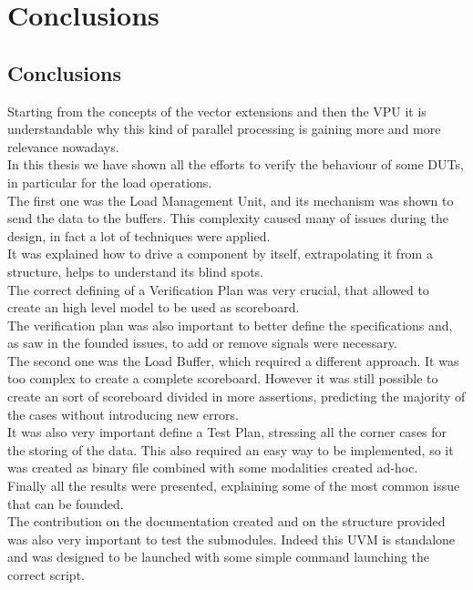 \chapter{Conclusions}
\section{Conclusions}
Starting from the concepts of the vector extensions and then the VPU it is understandable why this kind of parallel processing is gaining more and more relevance nowadays.\\

In this thesis we have shown all the efforts to verify the behaviour of some DUTs, in particular for the load operations.\\

The first one was the Load Management Unit, and its mechanism was shown to send the data to the buffers. This complexity caused many of issues during the design, in fact a lot of techniques were applied.\\
It was explained how to drive a component by itself, extrapolating it from a structure, helps to understand its blind spots.\\
The correct defining of a Verification Plan was very crucial, that allowed to create an high level model to be used as scoreboard.\\
The verification plan was also important to better define the specifications and, as saw in the founded issues, to add or remove signals were necessary.\\

The second one was the Load Buffer, which required a different approach. It was too complex to create a complete scoreboard. However it was still possible to create an sort of scoreboard divided in more assertions, predicting the majority of the cases without introducing new errors.\\
It was also very important define a Test Plan, stressing all the corner cases for the storing of the data. This also required an easy way to be implemented, so it was created as binary file combined with some modalities created ad-hoc.\\

Finally all the results were presented, explaining some of the most common issue that can be founded.\\
The contribution on the documentation created and on the structure provided was also very important to test the submodules. Indeed this UVM is standalone and was designed to be launched with some simple command launching the correct script.\\

